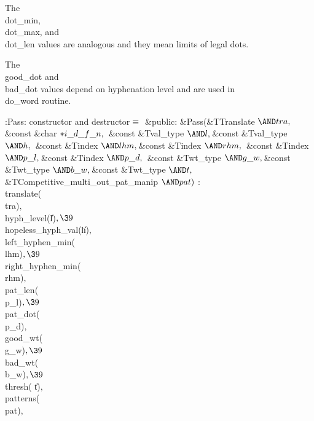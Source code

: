The \\{dot\_min}, \\{dot\_max}, and \\{dot\_len} values are analogous and they
mean limits of legal dots.

The \\{good\_dot} and \\{bad\_dot} values depend on hyphenation level and are
used in \\{do\_word} routine.

\Y\B\4:Pass: constructor and destructor\X${}\equiv{}$\6
\4\&{public}:\6
\&{Pass}(\&{TTranslate} ${}{\AND}\\{tra},\39{}$\&{const} \&{char} ${}{*}\\{i\_d%
\_f\_n},{}$\6
\&{const} \&{Tval\_type} ${}{\AND}\|l,\39{}$\&{const} \&{Tval\_type} ${}{\AND}%
\|h,{}$\6
\&{const} \&{Tindex} ${}{\AND}\\{lhm},\39{}$\&{const} \&{Tindex} ${}{\AND}%
\\{rhm},{}$\6
\&{const} \&{Tindex} ${}{\AND}\\{p\_l},\39{}$\&{const} \&{Tindex} ${}{\AND}\\{p%
\_d},{}$\6
\&{const} \&{Twt\_type} ${}{\AND}\\{g\_w},\39{}$\&{const} \&{Twt\_type} ${}{%
\AND}\\{b\_w},\39{}$\&{const} \&{Twt\_type} ${}{\AND}\|t,{}$\6
\&{TCompetitive\_multi\_out\_pat\_manip} ${}{\AND}\\{pat}){}$\1\1\2\2\6
: \\{translate}(\\{tra})${},{}$\6
\\{hyph\_level}(\|l)${},\39{}$ \\{hopeless\_hyph\_val}(\|h)${},{}$\6
\\{left\_hyphen\_min}(\\{lhm})${},\39{}$ \\{right\_hyphen\_min}(\\{rhm})${},{}$%
\6
\\{pat\_len}(\\{p\_l})${},\39{}$ \\{pat\_dot}(\\{p\_d})${},{}$\6
\\{good\_wt}(\\{g\_w})${},\39{}$ \\{bad\_wt}(\\{b\_w})${},\39{}$ \\{thresh}(%
\|t)${},{}$\6
\\{patterns}(\\{pat})${},{}$\7
